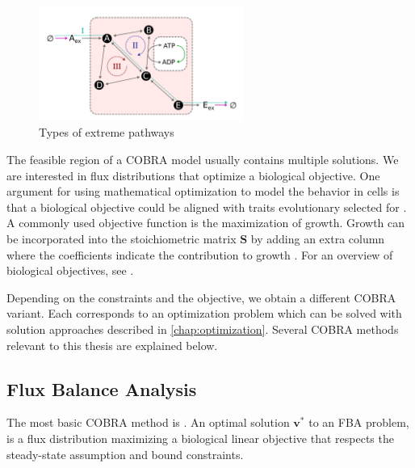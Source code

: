 \begin{figure}[h!]
    \centering
    \includegraphics[width=0.6\textwidth]{Images/extreme_pathways.png}
    \caption{Types of extreme pathways}
    \label{fig:extreme_pathways}
\end{figure}

The feasible region of a COBRA model usually contains multiple solutions. We are interested in flux distributions that optimize a biological objective. One argument for using mathematical optimization to model the behavior in cells is that a biological objective could be aligned with traits evolutionary selected for \cite{intro_computational_systems_biology}. A commonly used objective function is the maximization of growth. Growth can be incorporated into the stoichiometric matrix $\mathbf S$ by adding an extra column where the coefficients indicate the contribution to growth \cite{FBA}. For an overview of biological objectives, see \cite{palsson_systems_biology}.

Depending on the constraints and the objective, we obtain a different COBRA variant. Each corresponds to an optimization problem which can be solved with solution approaches described in \cref{chap:optimization}. Several COBRA methods relevant to this thesis are explained below.

\subsection{Flux Balance Analysis} \label{section:fba}
The most basic COBRA method is . An optimal solution $\mathbf v^*$ to an \textsf{FBA} problem, is a flux distribution maximizing a biological linear objective that respects the steady-state assumption and bound constraints.

